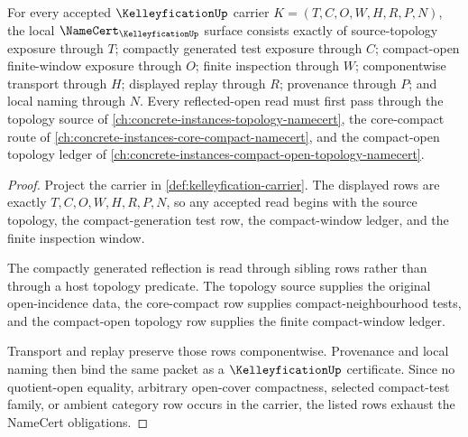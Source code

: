 \begin{theorem}
\label{thm:kelleyfication-namecert-obligations}
For every accepted $\KelleyficationUp$ carrier $K=(T,C,O,W,H,R,P,N)$, the local $\NameCert_{\KelleyficationUp}$ surface consists exactly of source-topology exposure through $T$; compactly generated test exposure through $C$; compact-open finite-window exposure through $O$; finite inspection through $W$; componentwise transport through $H$; displayed replay through $R$; provenance through $P$; and local naming through $N$. Every reflected-open read must first pass through the topology source of \autoref{ch:concrete-instances-topology-namecert}, the core-compact route of \autoref{ch:concrete-instances-core-compact-namecert}, and the compact-open topology ledger of \autoref{ch:concrete-instances-compact-open-topology-namecert}.
\end{theorem}
\begin{proof}
Project the carrier in \autoref{def:kelleyfication-carrier}. The displayed rows are exactly $T,C,O,W,H,R,P,N$, so any accepted read begins with the source topology, the compact-generation test row, the compact-window ledger, and the finite inspection window.

The compactly generated reflection is read through sibling rows rather than through a host topology predicate. The topology source supplies the original open-incidence data, the core-compact row supplies compact-neighbourhood tests, and the compact-open topology row supplies the finite compact-window ledger.

Transport and replay preserve those rows componentwise. Provenance and local naming then bind the same packet as a $\KelleyficationUp$ certificate. Since no quotient-open equality, arbitrary open-cover compactness, selected compact-test family, or ambient category row occurs in the carrier, the listed rows exhaust the NameCert obligations.
\end{proof}

